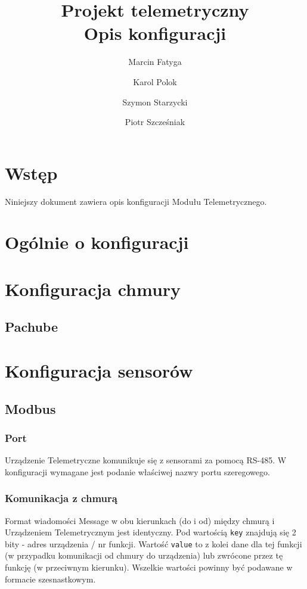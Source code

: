 \documentclass[11pt]{article}
\title{Projekt telemetryczny \\ Opis konfiguracji}
\author{Marcin Fatyga \and Karol Polok \and Szymon Starzycki \and Piotr Szcześniak}
\begin{document}
\begin{titlepage}

\maketitle

\thispagestyle{empty}
\end{titlepage}

\tableofcontents

\newpage

\section{Wstęp}
Niniejszy dokument zawiera opis konfiguracji Modułu Telemetrycznego.

\section{Ogólnie o konfiguracji}

\section{Konfiguracja chmury}

\subsection{Pachube}

\section{Konfiguracja sensorów}

\subsection{Modbus}

\subsubsection{Port}
Urządzenie Telemetryczne komunikuje się z sensorami za pomocą RS-485. W konfiguracji wymagane
jest podanie właściwej nazwy portu szeregowego.

\subsubsection{Komunikacja z chmurą}
Format wiadomości Message w obu kierunkach (do i od) między chmurą i Urządzeniem Telemetrycznym jest identyczny.
Pod wartością \verb|key| znajdują się 2 bity - adres urządzenia / nr funkcji. Wartość \verb|value| to z kolei dane
dla tej funkcji (w przypadku komunikacji od chmury do urządzenia) lub zwrócone przez tę funkcję (w przeciwnym kierunku).
Wszelkie wartości powinny być podawane w formacie szesnastkowym.
\end{document}
